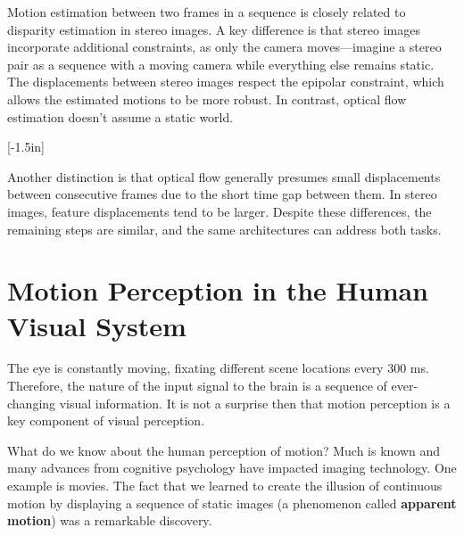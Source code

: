 Motion estimation between two frames in a sequence is closely related to disparity estimation in stereo images. A key difference is that stereo images incorporate additional constraints, as only the camera moves—imagine a stereo pair as a sequence with a moving camera while everything else remains static. The displacements between stereo images respect the epipolar constraint, which allows the estimated motions to be more robust. In contrast, optical flow estimation doesn't assume a static world.

[-1.5in]

Another distinction is that optical flow generally presumes small displacements between consecutive frames due to the short time gap between them. In stereo images, feature displacements tend to be larger. Despite these differences, the remaining steps are similar, and the same architectures can address both tasks.


\section{Motion Perception in the Human Visual System}


The eye is constantly moving, fixating different scene locations every 300 ms. Therefore, the nature of the input signal to the brain is a sequence of ever-changing visual information. It is not a surprise then that motion perception is a key component of visual perception. 



What do we know about the human perception of motion?  Much is known and many advances from cognitive psychology have impacted imaging technology. One example is movies. The fact that we learned to create the illusion of continuous motion by displaying a sequence of static images (a phenomenon called {\bf apparent motion}) was a remarkable discovery. 

